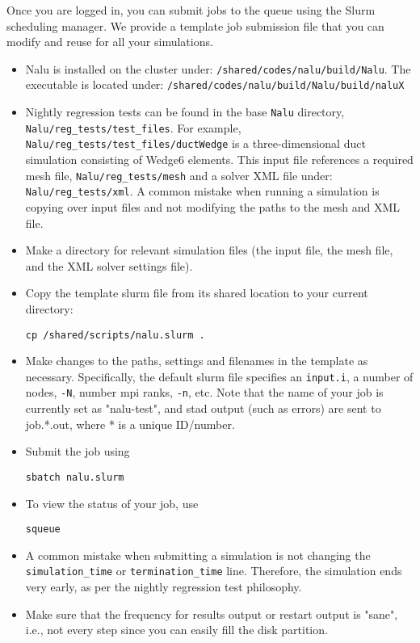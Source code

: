 \documentclass[letterpaper, 11pt]{article}
\begin{document}
\noindent
Once you are logged in, you can submit jobs to the queue using the Slurm 
scheduling manager. We provide a template job submission file that you can 
modify and reuse for all your simulations.
\begin{itemize}[noitemsep]
   \item Nalu is installed on the cluster under: \texttt{/shared/codes/nalu/build/Nalu}. 
   The executable is located under: \texttt{/shared/codes/nalu/build/Nalu/build/naluX}
   \item Nightly regression tests can be found in the base \texttt{Nalu} directory, \texttt{Nalu/reg\_tests/test\_files}.
   For example, \texttt{Nalu/reg\_tests/test\_files/ductWedge} is a three-dimensional duct simulation consisting of Wedge6 elements. This input file references a required mesh file, \texttt{Nalu/reg\_tests/mesh} and a solver XML file under: \texttt{Nalu/reg\_tests/xml}. A common mistake when running a simulation is copying over input files and not modifying the paths to the mesh and XML file.
    \item Make a directory for relevant simulation files (the input file, 
        the mesh file, and the XML solver settings file). 
    \item Copy the template slurm file from its shared location to your current
        directory: 

        \begin{center}
        \texttt{cp /shared/scripts/nalu.slurm .}
        \end{center}
    \item Make changes to the paths, settings and filenames in the template as
        necessary. Specifically, the default slurm file specifies an \texttt{input.i}, a number of nodes, \texttt{-N}, number mpi ranks, \texttt{-n}, etc. Note that the name of your job is currently set as "nalu-test", and stad output (such as errors) are sent to job.*.out, where * is a unique ID/number.
    \item Submit the job using 

        \begin{center}
        \texttt{sbatch nalu.slurm}
        \end{center}
    \item To view the status of your job, use 

        \begin{center}
        \texttt{squeue}
        \end{center}
        \item A common mistake when submitting a simulation is not changing the \texttt{simulation\_time} or \texttt{termination\_time} line. Therefore, the simulation ends very early, as per the nightly regression test philosophy.
        \item Make sure that the frequency for results output or restart output is "sane", i.e., not every step since you can easily fill the disk partition.
\end{itemize}
\end{document}
